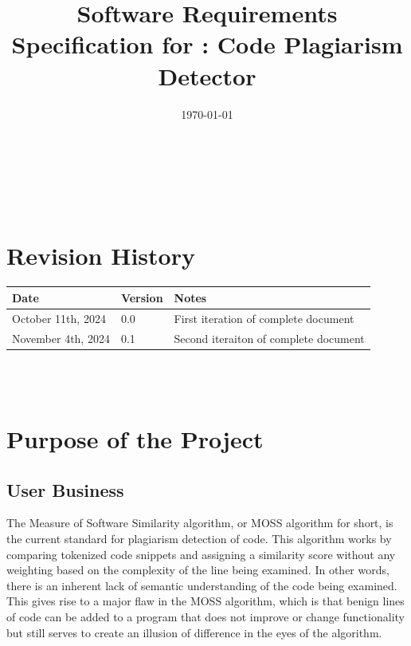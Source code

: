 \documentclass[12pt]{article}
\begin{document}
\title{Software Requirements Specification for \progname: Code Plagiarism Detector} 
\author{\authname}
\date{\today}
	
\maketitle

~\newpage


\tableofcontents

~\newpage

\section*{Revision History}

\begin{tabularx}{\textwidth}{p{3cm}p{2cm}X}
\toprule {\textbf{Date}} & {\textbf{Version}} & {\textbf{Notes}}\\
\midrule
October 11th, 2024 & 0.0 & First iteration of complete document\\
November 4th, 2024 & 0.1 & Second iteraiton of complete document\\
\bottomrule
\end{tabularx}

~\\

~\newpage
\section{Purpose of the Project}
\subsection{User Business}

The Measure of Software Similarity algorithm, or MOSS algorithm for short, is
the current standard for plagiarism detection of code. This
algorithm works by comparing tokenized code snippets and assigning a similarity
score without any weighting based on the complexity of the line being examined.
In other words, there is an inherent lack of semantic understanding of the code
being examined. This gives rise to a major flaw in the MOSS algorithm, which is
that benign lines of code can be added to a program that does not improve or
change functionality but still serves to create an illusion of difference in the
eyes of the algorithm. 
\end{document}
